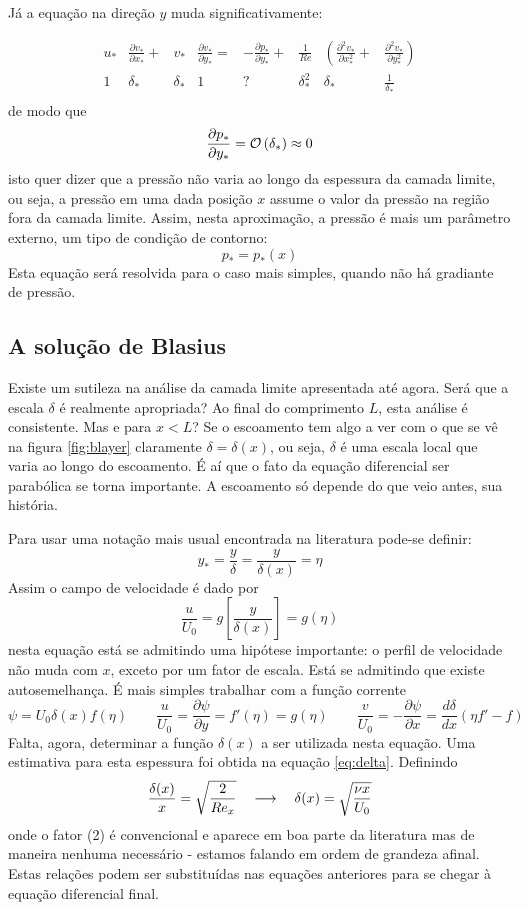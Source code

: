 Já a equação na direção $y$ muda significativamente:

\[
\begin{matrix}
u_*&\frac{\partial v_*}{\partial x_*} + &v_*&\frac{\partial v_*}{\partial y_*} =& 
-\frac{\partial p_*}{\partial y_*} + &\frac{1}{Re} &\left( \frac{\partial^2 v_*}{\partial x_*^2}\right. +& \left.\frac{\partial^2 v_*}{\partial y_*^2}\right) \\
 1 & \delta_* & \delta_* & 1 & ? & \delta_*^2 & \delta_* & \frac{1}{\delta_*} \\
\end{matrix}
\]
de modo que 
\[
\frac{\partial p_*}{\partial y_*} = \mathcal{O}\left(\delta_*\right) \approx 0
\]
isto quer dizer que a pressão não varia ao longo da espessura da camada limite, ou seja, a pressão em uma dada posição $x$ assume o valor da pressão na região fora da camada limite. Assim, nesta aproximação, a pressão é mais um parâmetro externo, um tipo de condição de contorno:
\[
p_* = p_*(x)
\]
Esta equação será resolvida para o caso mais simples, quando não há gradiante de pressão.

\subsection{A solução de Blasius}

Existe um sutileza na análise da camada limite apresentada até agora. Será que a escala $\delta$ é realmente apropriada? Ao final do comprimento $L$, esta análise é consistente. Mas e para $x < L$? Se o escoamento tem algo a ver com o que se vê na figura \ref{fig:blayer} claramente $\delta = \delta(x)$, ou seja, $\delta$ é uma escala local que varia ao longo do escoamento. É aí que o fato da equação diferencial ser parabólica se torna importante. A escoamento só depende do que veio antes, sua história. 

Para usar uma notação mais usual encontrada na literatura pode-se definir:
\[
y_* = \frac{y}{\delta} = \frac{y}{\delta(x)} = \eta
\]
Assim o campo de velocidade é dado por
\[
\frac{u}{U_0} = g\left[\frac{y}{\delta(x)}\right] = g(\eta)
\]
nesta equação está se admitindo uma hipótese importante: o perfil de velocidade não muda com $x$, exceto por um fator de escala. Está se admitindo que existe autosemelhança. É mais simples trabalhar com a função corrente
\[
\psi = U_0 \delta(x) f(\eta) \qquad \frac{u}{U_0} = \frac{\partial\psi}{\partial y}=f'(\eta)=g(\eta) \qquad \frac{v}{U_0} =-\frac{\partial\psi}{\partial x} = \frac{d\delta}{dx}\left(\eta f' - f\right)
\]
Falta, agora, determinar a função $\delta(x)$ a ser utilizada nesta equação. Uma estimativa para esta espessura foi obtida na equação \ref{eq:delta}. Definindo 
\begin{equation}
  \frac{\delta(x)}{x} = \sqrt{\frac{2}{Re_x}} \quad\longrightarrow\quad \delta(x) = \sqrt{\frac{\nu x}{U_0}}
  \label{eq:delta2}
\end{equation}
onde o fator (2) é convencional e aparece em boa parte da literatura mas de maneira nenhuma necessário - estamos falando em ordem de grandeza afinal. Estas relações podem ser substituídas nas equações anteriores para se chegar à equação diferencial final.

